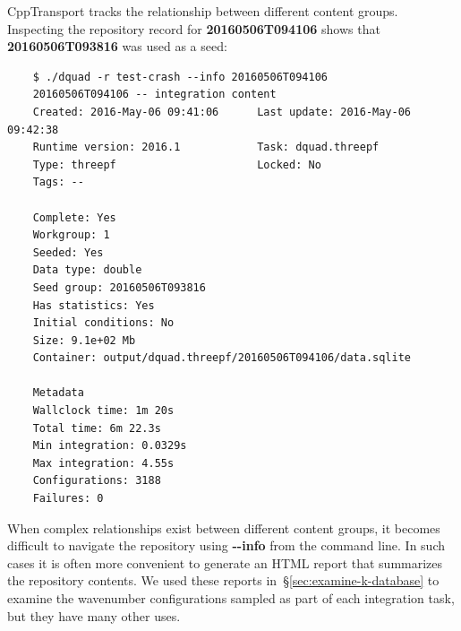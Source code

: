\documentclass[11pt,a4paper]{article}
\newcommand{\repoobject}[1]{{\ttfamily\bfseries\small #1}}
\newcommand{\packagefont}{\sffamily}
\newcommand{\CppTransport}{{\packagefont CppTransport}}
\newcommand{\option}[1]{{\ttfamily\bfseries\small #1}}
\begin{document}
{\CppTransport} tracks the relationship between different content groups.
Inspecting the repository record for \repoobject{20160506T094106}
shows that \repoobject{20160506T093816} was used as a seed:
\begin{verbatim}
    $ ./dquad -r test-crash --info 20160506T094106
    20160506T094106 -- integration content
    Created: 2016-May-06 09:41:06      Last update: 2016-May-06 09:42:38  
    Runtime version: 2016.1            Task: dquad.threepf                
    Type: threepf                      Locked: No                         
    Tags: --                           
    
    Complete: Yes  
    Workgroup: 1  
    Seeded: Yes  
    Data type: double  
    Seed group: 20160506T093816  
    Has statistics: Yes  
    Initial conditions: No  
    Size: 9.1e+02 Mb  
    Container: output/dquad.threepf/20160506T094106/data.sqlite  
    
    Metadata
    Wallclock time: 1m 20s  
    Total time: 6m 22.3s  
    Min integration: 0.0329s  
    Max integration: 4.55s  
    Configurations: 3188  
    Failures: 0      
\end{verbatim}

When complex relationships exist
between different content groups,
it becomes difficult to navigate the repository
using \option{{-}{-}info} from the command line.
In such cases it is often more convenient to generate an HTML report
that summarizes the repository contents.
We used these reports in~\S\ref{sec:examine-k-database}
to examine the wavenumber configurations
sampled as part of
each integration task, but they have many other uses.
\end{document}
